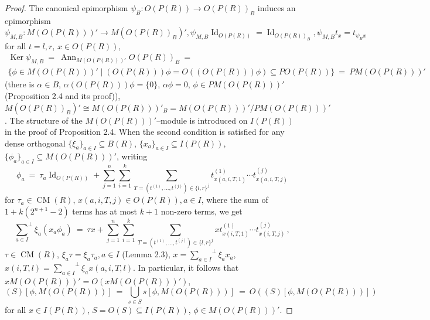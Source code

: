 \documentclass[10pt,a4paper]{amsart}
\DeclareMathOperator{\Ann}{Ann}
\DeclareMathOperator{\CM}{CM}
\DeclareMathOperator{\Id}{Id}
\DeclareMathOperator{\Ker}{Ker}
\begin{document}
\begin{proof}
The canonical epimorphism ${\psi_B: O(P(R))\longrightarrow O(P(R))_B}$ induces 
an epimorphism ${\psi_{M, B}: M(O(P(R)))'\longrightarrow M(O(P(R))_B)', 
\psi_{M, B} \Id_{O(P(R))}=\Id_{O(P(R))_B}, 
\psi_{M, B} t_x=t_{\psi_B x}}$ for all ${t=l, r}$, ${x\in O(P(R))}$, 
\begin{multline*}
\Ker \psi_{M, B}\ =\ \Ann_{M(O(P(R)))'} O(P(R))_B\ =
\\ 
\{\phi\in M(O(P(R)))'\mid (O(P(R)))\phi=O((O(P(R)))\phi)
\subseteq P O(P(R))\}\ =\ P M(O(P(R)))'
\end{multline*}
(there is ${\alpha\in B}$, ${\alpha (O(P(R)))\phi=\{0\}}$, ${\alpha \phi=0}$, 
${\phi\in P M(O(P(R)))'}$ (Proposition 2.4 and its proof)),
${M(O(P(R))_B)'\cong M(O(P(R)))'_B=M(O(P(R)))'/P M(O(P(R)))'}$. 
The structure of the $M(O(P(R)))'$--module is introduced on $I(P(R))$ in the 
proof of Proposition 2.4. When the second condition is satisfied for any dense 
orthogonal ${\{\xi_a\}_{a\in I}\subseteq B(R)}$, 
${\{x_a\}_{a\in I}\subseteq I(P(R))}$, 
${\{\phi_a\}_{a\in I}\subseteq M(O(P(R)))'}$, writing 
\[
\phi_a\ =\ \tau_a \Id_{O(P(R))}+
\sum_{j=1}^n \sum_{i=1}^k \sum_{T=(t^{(1)}, \ldots, t^{(j)})\in 
\{l, r\}^j} t^{(1)}_{x(a, i, T, 1)}\cdots t^{(j)}_{x(a, i, T, j)}
\]
for ${\tau_a\in \CM(R)}$, ${x(a, i, T, j)\in O(P(R)), a\in I}$, where the sum 
of ${1+k (2^{n+1}-2)}$ terms has at most ${k+1}$ non-zero terms, we get 
\[
{\sum_{a\in I}}^{\perp} \xi_a (x_a \phi_a)\ =\ 
\tau x+
\sum_{j=1}^n \sum_{i=1}^k \sum_{T=(t^{(1)}, \ldots, t^{(j)})\in 
\{l, r\}^j} x t^{(1)}_{x(i, T, 1)}\cdots t^{(j)}_{x(i, T, j)}\,,
\]
${\tau\in \CM(R)}$, ${\xi_a \tau=\xi_a \tau_a, a\in I}$ (Lemma 2.3), 
${x={\sum\limits_{a\in I}}^{\perp} \xi_a x_a}$, 
${x(i, T, l)={\sum\limits_{a\in I}}^{\perp} \xi_a x(a, i, T, l)}.$ 
In particular, it follows that ${x M(O(P(R)))'=O(x M(O(P(R)))')}$, 
\[
(S)[\phi, M(O(P(R)))]\ =\ 
\bigcup\limits_{s\in S} s [\phi, M(O(P(R)))]\ =\ O((S)[\phi, M(O(P(R)))])
\]
for all ${x\in I(P(R))}$, ${S=O(S)\subseteq I(P(R))}$, ${\phi\in M(O(P(R)))'}$.


\end{proof}
\end{document}
